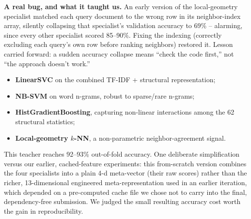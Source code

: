 \documentclass[10pt,twocolumn]{article}
\begin{document}
\textbf{A real bug, and what it taught us.} An early version of the local-geometry specialist matched each query document to the wrong row in its neighbor-index array, silently collapsing that specialist's validation accuracy to 69\% -- alarming, since every other specialist scored 85--90\%. Fixing the indexing (correctly excluding each query's own row before ranking neighbors) restored it. Lesson carried forward: a sudden accuracy collapse means ``check the code first,'' not ``the approach doesn't work.''

\begin{itemize}[leftmargin=1em, itemsep=0pt, topsep=2pt]
\item[--] \textbf{LinearSVC} on the combined TF-IDF + structural representation;
\item[--] \textbf{NB-SVM} on word n-grams, robust to sparse/rare n-grams;
\item[--] \textbf{HistGradientBoosting}, capturing non-linear interactions among the 62 structural statistics;
\item[--] \textbf{Local-geometry $k$-NN}, a non-parametric neighbor-agreement signal.
\end{itemize}

This teacher reaches 92--93\% out-of-fold accuracy. One deliberate simplification versus our earlier, cached-feature experiments: this from-scratch version combines the four specialists into a plain 4-d meta-vector (their raw scores) rather than the richer, 13-dimensional engineered meta-representation used in an earlier iteration, which depended on a pre-computed cache file we chose not to carry into the final, dependency-free submission. We judged the small resulting accuracy cost worth the gain in reproducibility.
\end{document}

